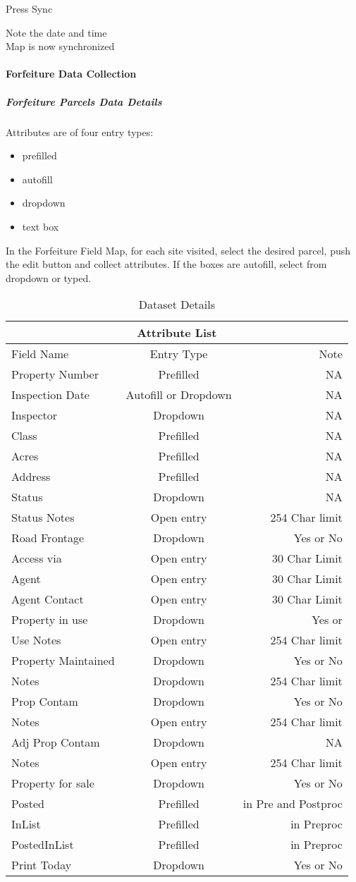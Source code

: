 \documentclass[class=article , crop=false, titlepage, twoside, multi={itemize, figure, verbatim}, float=false]{standalone}
\begin{document}
\noindent Press Sync
\vspace{1.5in}

Note the date and time\\

Map is now synchronized
\clearpage
\paragraph{Forfeiture Data Collection}
\subparagraph{Forfeiture Parcels Data Details}
Attributes are of four entry types:\begin{itemize}
\item prefilled
\item autofill
\item dropdown
\item text box \end{itemize}
In the Forfeiture Field Map, for each site visited, select the desired parcel, push the edit button and collect attributes.  If the boxes are autofill, select from dropdown or typed.\bigskip 
\begin{table}
\centering
\begin{tabular}{|l|c|r|}
\hline
\multicolumn{3}{|c|}{Attribute List} \\
\hline
Field Name&Entry Type&Note\\ \hline
Property Number&Prefilled&NA\\
Inspection Date&{\scriptsize Autofill or Dropdown}&NA\\
Inspector&Dropdown&NA\\
Class&Prefilled&NA\\
Acres&Prefilled&NA\\
Address&Prefilled&NA\\
Status&Dropdown&NA\\
Status Notes&Open entry&254 Char limit\\
Road Frontage&Dropdown&Yes or No\\
Access via&Open entry&30 Char Limit\\
Agent&Open entry&30 Char Limit\\
Agent Contact&Open entry&30 Char Limit\\
Property in use&Dropdown&Yes or\\
Use Notes&Open entry&254 Char limit\\
Property Maintained&Dropdown&Yes or No\\
Notes&Dropdown&254 Char limit\\
Prop Contam&Dropdown&Yes or No\\
Notes&Open entry&254 Char limit\\
Adj Prop Contam&Dropdown&NA\\
Notes&Open entry&254 Char limit\\
Property for sale&Dropdown&Yes or No\\
Posted&Prefilled&in Pre and Postproc\\
InList&Prefilled&in Preproc\\
PostedInList&Prefilled&in Preproc\\
Print Today&Dropdown&Yes or No\\ \hline
\end{tabular}
\caption{Dataset Details}
\end{table}
\end{document}
